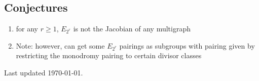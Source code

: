 \documentclass{amsart}
\begin{document}
\subsection{Conjectures}

\begin{enumerate}

\item for any $r\ge1$, $E_{2^r}$ is not the Jacobian of any multigraph

\item Note: however, can get some $E_{2^r}$ pairings as subgroups with
pairing given by restricting the monodromy pairing to certain divisor
classes
\end{enumerate}

\vspace{1cm} Last updated \today.
\end{document}
